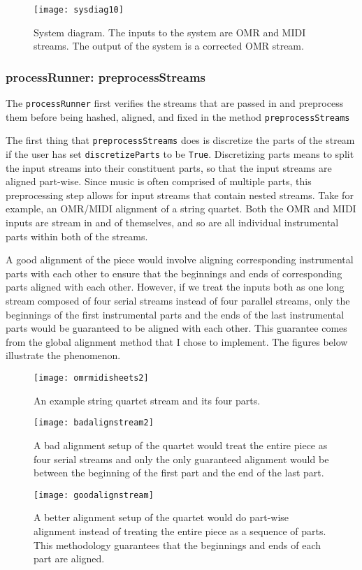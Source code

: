 \begin{figure}[!h]
\centering
\texttt{[image: sysdiag10]}
\caption{System diagram. The inputs to the system are OMR and MIDI streams. The output of the system is a corrected OMR stream.}
\end{figure}

\subsubsection{processRunner: preprocessStreams}
The \texttt{processRunner} first verifies the streams that are passed in and preprocess them before being hashed, aligned, and fixed in the method \texttt{preprocessStreams}

The first thing that \texttt{preprocessStreams} does is discretize the parts of the stream if the user has set \texttt{discretizeParts} to be \texttt{True}. Discretizing parts means to split the input streams into their constituent parts, so that the input streams are aligned part-wise. Since music is often comprised of multiple parts, this preprocessing step allows for input streams that contain nested streams. Take for example, an OMR/MIDI alignment of a string quartet. Both the OMR and MIDI inputs are stream in and of themselves, and so are all individual instrumental parts within both of the streams. 

A good alignment of the piece would involve aligning corresponding instrumental parts with each other to ensure that the beginnings and ends of corresponding parts aligned with each other. However, if we treat the inputs both as one long stream composed of four serial streams instead of four parallel streams, only the beginnings of the first instrumental parts and the ends of the last instrumental parts would be guaranteed to be aligned with each other. This guarantee comes from the global alignment method that I chose to implement. The figures below illustrate the phenomenon. 

\begin{figure}[!h]
\centering
\texttt{[image: omrmidisheets2]}
\caption{An example string quartet stream and its four parts.}
\vspace{10mm}
\texttt{[image: badalignstream2]}
\caption{A bad alignment setup of the quartet would treat the entire piece as four serial streams and only the only guaranteed alignment would be between the beginning of the first part and the end of the last part.}
\vspace{10mm}
\texttt{[image: goodalignstream]}
\caption{A better alignment setup of the quartet would do part-wise alignment instead of treating the entire piece as a sequence of parts. This methodology guarantees that the beginnings and ends of each part are aligned.}
\end{figure}

